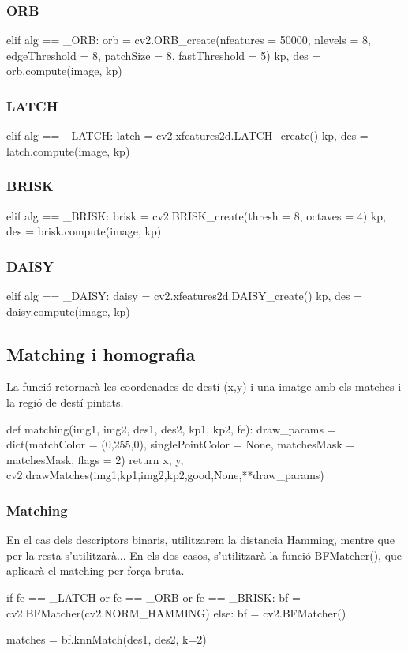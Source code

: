 		\subsubsection{ORB}
		\begin{python}
	elif alg == _ORB:
		orb = cv2.ORB_create(nfeatures = 50000, nlevels = 8, edgeThreshold = 8,
				patchSize = 8, fastThreshold = 5)
		kp, des = orb.compute(image, kp)
		\end{python}

		\subsubsection{LATCH}
		\begin{python}
	elif alg == _LATCH:
		latch = cv2.xfeatures2d.LATCH_create()
		kp, des = latch.compute(image, kp)
		\end{python}

		\subsubsection{BRISK}
		\begin{python}
	elif alg == _BRISK:
		brisk = cv2.BRISK_create(thresh = 8, octaves = 4)
		kp, des = brisk.compute(image, kp)
		\end{python}

		\subsubsection{DAISY}
		\begin{python}
	elif alg == _DAISY:
		daisy = cv2.xfeatures2d.DAISY_create()
		kp, des = daisy.compute(image, kp)
		\end{python}

\newpage
	\subsection{Matching i homografia}
La funció retornarà les coordenades de destí (x,y) i una imatge amb els matches i la regió de destí pintats.\\
		\begin{python}
def matching(img1, img2, des1, des2, kp1, kp2, fe):
	draw_params = dict(matchColor = (0,255,0), singlePointColor = None,
					matchesMask = matchesMask, flags = 2)
	return x, y, cv2.drawMatches(img1,kp1,img2,kp2,good,None,**draw_params)
		\end{python}

		\subsubsection{Matching}
		En el cas dels descriptors binaris, utilitzarem la distancia Hamming, mentre que per la resta s'utilitzarà... En els dos casos, s'utilitzarà la funció BFMatcher(), que aplicarà el matching
		per força bruta.\\
		\begin{python}
	if fe == _LATCH or fe == _ORB or fe == _BRISK:
		bf = cv2.BFMatcher(cv2.NORM_HAMMING)
	else:
		bf = cv2.BFMatcher()

	matches = bf.knnMatch(des1, des2, k=2)
		\end{python}

